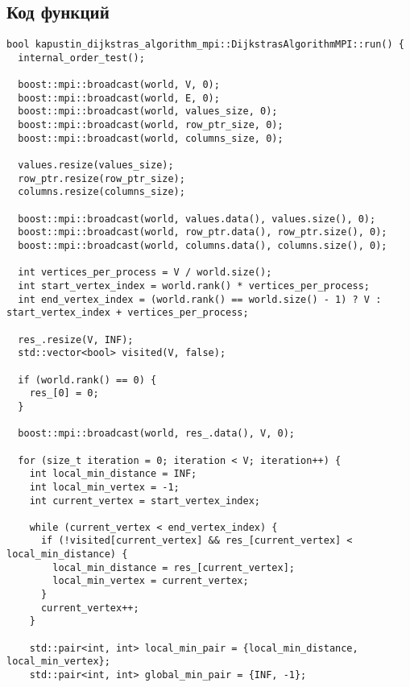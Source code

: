 \documentclass[a4paper,14pt]{extarticle}
\begin{document}
\subsection{Код функций}

\begin{lstlisting}[caption={Функция run параллельного алгоритма}]
bool kapustin_dijkstras_algorithm_mpi::DijkstrasAlgorithmMPI::run() {
  internal_order_test();

  boost::mpi::broadcast(world, V, 0);
  boost::mpi::broadcast(world, E, 0);
  boost::mpi::broadcast(world, values_size, 0);
  boost::mpi::broadcast(world, row_ptr_size, 0);
  boost::mpi::broadcast(world, columns_size, 0);

  values.resize(values_size);
  row_ptr.resize(row_ptr_size);
  columns.resize(columns_size);

  boost::mpi::broadcast(world, values.data(), values.size(), 0);
  boost::mpi::broadcast(world, row_ptr.data(), row_ptr.size(), 0);
  boost::mpi::broadcast(world, columns.data(), columns.size(), 0);

  int vertices_per_process = V / world.size();
  int start_vertex_index = world.rank() * vertices_per_process;
  int end_vertex_index = (world.rank() == world.size() - 1) ? V : start_vertex_index + vertices_per_process;

  res_.resize(V, INF);
  std::vector<bool> visited(V, false);

  if (world.rank() == 0) {
    res_[0] = 0;
  }

  boost::mpi::broadcast(world, res_.data(), V, 0);

  for (size_t iteration = 0; iteration < V; iteration++) {
    int local_min_distance = INF;
    int local_min_vertex = -1;
    int current_vertex = start_vertex_index;

    while (current_vertex < end_vertex_index) {
      if (!visited[current_vertex] && res_[current_vertex] < local_min_distance) {
        local_min_distance = res_[current_vertex];
        local_min_vertex = current_vertex;
      }
      current_vertex++;
    }

    std::pair<int, int> local_min_pair = {local_min_distance, local_min_vertex};
    std::pair<int, int> global_min_pair = {INF, -1};


\end{lstlisting}
\end{document}
